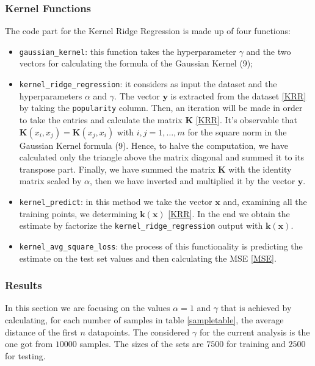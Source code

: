\documentclass{article}
\begin{document}
\subsubsection{Kernel Functions}
\label{subsubsec:kernelfunc}
The code part for the Kernel Ridge Regression is made up of four functions:
\begin{itemize}
	\item \texttt{gaussian\_kernel}: this function takes the hyperparameter $\gamma$ and the two vectors for calculating the formula of the Gaussian Kernel (9);
	              
	\item \texttt{kernel\_ridge\_regression}: it considers as input the dataset and the hyperparameters $\alpha$ and $\gamma$. 
	      The vector $\boldsymbol{y}$ is extracted from the dataset \eqref{KRR} by taking the \texttt{popularity} column. Then, an iteration will be made in order to take the entries and calculate the matrix $\boldsymbol{K}$ \eqref{KRR}. 
	      It's observable that $\boldsymbol{K}(x_i, x_j) = \boldsymbol{K}(x_j, x_i)$ with $ i,j = 1, \dots, m$ for the square norm in the Gaussian Kernel formula (9). Hence, to halve the computation, we have calculated only the triangle above the matrix diagonal and summed it to its transpose part. Finally, we have summed the matrix $\boldsymbol{K}$ with the identity matrix scaled by $\alpha$, then we have inverted and multiplied it by the vector $\boldsymbol{y}$.
	\item \texttt{kernel\_predict}:
	      in this method we take the vector $\boldsymbol{x}$ and, examining all the training points, we determining $\boldsymbol{k}(\boldsymbol{x})$ \eqref{KRR}. In the end we obtain the estimate by factorize the \texttt{kernel\_ridge\_regression} output with $\boldsymbol{k}(\boldsymbol{x})$. 
	\item \texttt{kernel\_avg\_square\_loss}: the process of this functionality is predicting the estimate on the test set values and then calculating the MSE \eqref{MSE}.  
\end{itemize}

\subsubsection{Results}
In this section we are focusing on the values $\alpha = 1$ and $\gamma$ that is achieved by calculating, for each number of samples in table \ref{sampletable}, the average distance of the first $n$ datapoints. The considered $\gamma$ for the current analysis is the one got from $10000$ samples. The sizes of the sets are $7500$ for training and $2500$ for testing.
\end{document}
